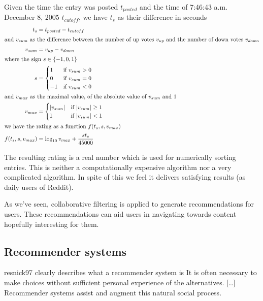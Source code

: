 Given the time the entry was posted $t_{posted}$ and
the time of 7:46:43 a.m. December 8, 2005 $t_{cutoff}$,
we have $t_s$ as their difference in seconds
\begin{align*}
  t_s &= t_{posted} - t_{cutoff} \\
  \intertext{and $v_{sum}$ as the difference between the number of up votes
             $v_{up}$ and the number of down votes $v_{down}$}
  v_{sum} &= v_{up} - v_{down} \\
  \intertext{where the sign $s \in \{-1, 0, 1\}$}
  s &= 
  \begin{cases} 
     1 & \text{if } v_{sum} > 0 \\
     0 & \text{if } v_{sum} = 0 \\
    -1 & \text{if } v_{sum} < 0
  \end{cases} \\
  \intertext{and $v_{max}$ as the maximal value,
             of the absolute value of $v_{sum}$ and $1$}
  v_{max} &= 
  \begin{cases} 
    |v_{sum}| & \text{if } |v_{sum}| \geq 1 \\
    1   & \text{if } |v_{sum}| < 1
  \end{cases} \\
  \intertext{we have the rating as a function $f(t_s, s, v_{max})$}
  f(t_s, s, v_{max}) &= \log_{10}{v_{max}} + \frac{st_s}{45000}
\end{align*}

The resulting rating is a real number which is used for numerically sorting
entries. This is neither a computationally expensive algorithm nor a very
complicated algorithm. In spite of this we feel it delivers satisfying results
(as daily users of Reddit).

\parabreak

As we've seen, collaborative filtering is applied to generate
recommendations for users. These recommendations can aid users in navigating
towards content hopefully interesting for them.

\subsection{Recommender systems}
\label{section:social.navigation.applied.forms.recommendations}

\begin{fullquote}[\p{56}]{resnick97}{%
  clearly describes what a recommender system is}
  It is often necessary to make choices without sufficient
  personal experience of the alternatives.
  [\ldots]
  Recommender systems assist and augment this
  natural social process.
\end{fullquote}


